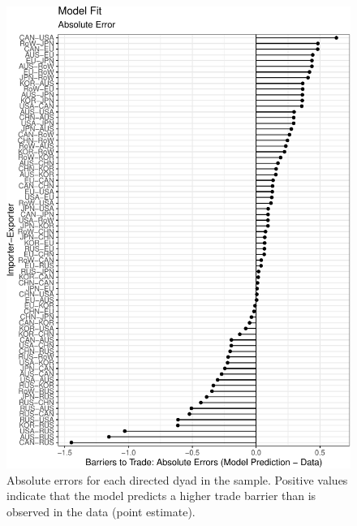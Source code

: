 \documentclass{puthesis}
\begin{document}
\begin{figure}
\centering
\includegraphics{figure/fit_ddyad-1.pdf}
\caption{Absolute errors for each directed dyad in the sample. Positive
values indicate that the model predicts a higher trade barrier than is
observed in the data (point estimate). \label{fig:fit_ddyad}}
\end{figure}
\end{document}
